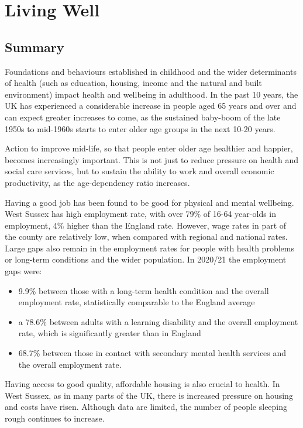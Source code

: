 \section{Living Well}
\subsection{Summary}
Foundations and behaviours established in childhood and the wider determinants of health (such as education, housing, income and the natural and built environment) impact health and wellbeing in adulthood. In the past 10 years, the UK has experienced a considerable increase in people aged 65 years and over and can expect greater increases to come, as the sustained baby-boom of the late 1950s to mid-1960s starts to enter older age groups in the next 10-20 years.

Action to improve mid-life, so that people enter older age healthier and happier, becomes increasingly important. This is not just to reduce pressure on health and social care services, but to sustain the ability to work and overall economic productivity, as the age-dependency ratio increases.

Having a good job has been found to be good for physical and mental wellbeing. West Sussex has high employment rate, with over 79\% of 16-64 year-olds in employment, 4\% higher than the England rate. However, wage rates in part of the county are relatively low, when compared with regional and national rates. Large gaps also remain in the employment rates for people with health problems or long-term conditions and the wider population. In 2020/21 the employment gaps were:

\begin{itemize}[noitemsep]
    \item 9.9\% between those with a long-term health condition and the overall employment rate, statistically comparable to the England average
    \item a 78.6\% between adults with a learning disability and the overall employment rate, which is significantly greater than in England
    \item 68.7\% between those in contact with secondary mental health services and the overall employment rate.
\end{itemize}

Having access to good quality, affordable housing is also crucial to health. In West Sussex, as in many parts of the UK, there is increased pressure on housing and costs have risen. Although data are limited, the number of people sleeping rough continues to increase.

